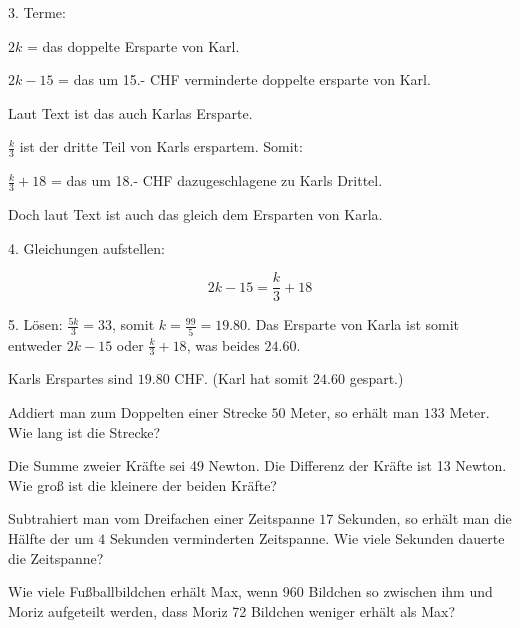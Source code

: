 \begin{bbwAufgabenBlock}
{3. Terme:

$2k$ = das doppelte Ersparte von Karl.

$2k-15$ = das um 15.- CHF verminderte doppelte ersparte von Karl.

Laut Text ist das auch Karlas Ersparte.

$\frac{k}3$ ist der dritte Teil von Karls erspartem. Somit:

$\frac{k}3 + 18$ = das um 18.- CHF dazugeschlagene zu Karls Drittel.

Doch laut Text ist auch das gleich dem Ersparten von Karla.

4. Gleichungen aufstellen:

$$2k-15 = \frac{k}3 + 18$$

5. Lösen: $\frac{5k}3 = 33$, somit $k=\frac{99}5 = 19.80$. Das
Ersparte von Karla ist somit entweder $2k-15$ oder $\frac{k}3+18$, was
beides $24.60$.

Karls Erspartes sind  $19.80$ CHF. (Karl hat somit
$24.60$ gespart.)}



\item Addiert man zum Doppelten einer Strecke $50$ Meter, so erhält man
$133$ Meter. Wie lang ist die Strecke?



\item Die Summe zweier Kräfte sei 49 Newton. Die Differenz der Kräfte
ist 13 Newton. Wie groß ist die kleinere der beiden Kräfte?


\item Subtrahiert man vom Dreifachen einer Zeitspanne $17$ Sekunden, so
erhält man die Hälfte der um $4$ Sekunden verminderten Zeitspanne. Wie
viele Sekunden dauerte die Zeitspanne?


\noTRAINER{\newpage}

\item Wie viele Fußballbildchen erhält Max, wenn 960 Bildchen so
zwischen ihm und Moriz aufgeteilt werden, dass Moriz 72 Bildchen
weniger erhält als Max?


\end{bbwAufgabenBlock}
